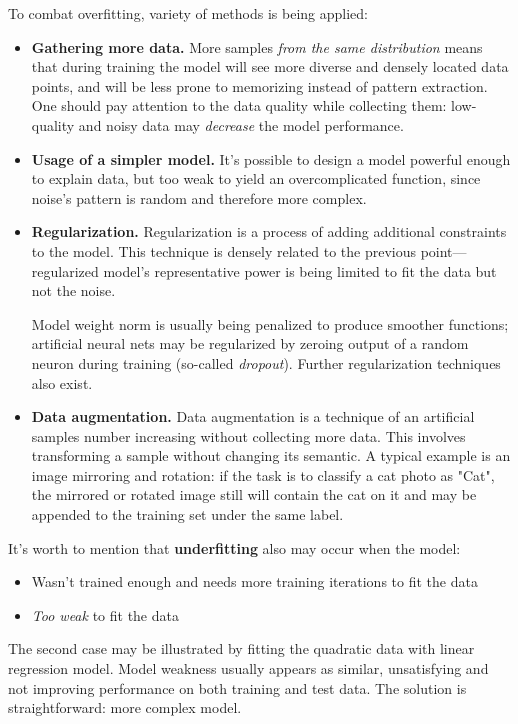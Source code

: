 \documentclass[thesis=B,english]{FITthesis}[2019/12/23]
\begin{document}
	To combat overfitting, variety of methods is being applied:
	\begin{itemize}
		\item \textbf{Gathering more data.} More samples \textit{from the same distribution} means that during training the model will see more diverse and densely located data points, and will be less prone to memorizing instead of pattern extraction. One should pay attention to the data quality while collecting them: low-quality and noisy data may \textit{decrease} the model performance.
		
		\item \textbf{Usage of a simpler model.} It's possible to design a model powerful enough to explain data, but too weak to yield an overcomplicated function, since noise's pattern is random and therefore more complex.
		
		\item \textbf{Regularization.} Regularization is a process of adding additional constraints to the model. This technique is densely related to the previous point---regularized model's representative power is being limited to fit the data but not the noise.
		
		Model weight norm is usually being penalized to produce smoother functions; artificial neural nets may be regularized by zeroing output of a random neuron during training (so-called \textit{dropout}). Further regularization techniques also exist.
		
		\item \textbf{Data augmentation.} Data augmentation is a technique of an artificial samples number increasing without collecting more data. This involves transforming a sample without changing its semantic. A typical example is an image mirroring and rotation: if the task is to classify a cat photo as "Cat", the mirrored or rotated image still will contain the cat on it and may be appended to the training set under the same label.
		
	\end{itemize}
	
	It's worth to mention that \textbf{underfitting} also may occur when the model:
	\begin{itemize}
		\item Wasn't trained enough and needs more training iterations to fit the data
		\item \textit{Too weak} to fit the data
	\end{itemize}
	
	The second case may be illustrated by fitting the quadratic data with linear regression model. Model weakness usually appears as similar, unsatisfying and not improving performance on both training and test data. The solution is straightforward: more complex model.
	
\end{document}
